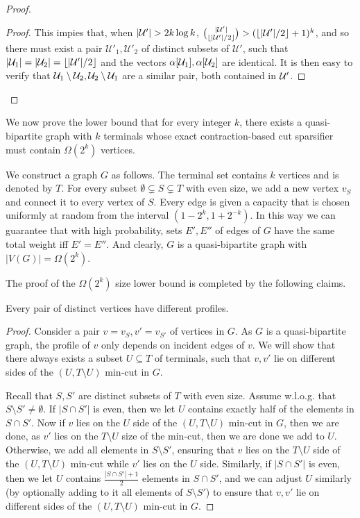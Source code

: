 \begin{proof}
\begin{proof}
This impies that, when $|\uset'|>2k\log k$, $\binom{|{\mathcal U}'|}{\left\lfloor |{\mathcal U}'|/2 \right\rfloor}>(\left\lfloor |{\mathcal U}'|/2 \right\rfloor+1)^k$, and so there must exist a pair $\mathcal{U}'_1,\mathcal{U}'_2$  of distinct subsets of $\mathcal{U}'$, such that $\left| \mathcal{U}_1 \right| = \left| \mathcal{U}_2 \right| = \left\lfloor |{\mathcal U}'|/2 \right\rfloor$ and the vectors $\alpha[{\mathcal U}_1],\alpha[{\mathcal U}_2]$ are identical.
It is then easy to verify that ${\mathcal U}_1\setminus {\mathcal U}_2,{\mathcal U}_2\setminus {\mathcal U}_1$ are a similar pair, both contained in ${\mathcal U}'$. 
\end{proof}
\end{proof}


We now prove the lower bound that for every integer $k$, there exists a quasi-bipartite graph with $k$ terminals whose exact contraction-based cut sparsifier must contain $\Omega(2^k)$ vertices.


We construct a graph $G$ as follows. The terminal set contains $k$ vertices and is denoted by $T$. For every subset $\emptyset\subsetneq S \subsetneq T$ with even size, we add a new vertex $v_S$ and connect it to every vertex of $S$.
Every edge is given a capacity that is chosen uniformly at random from the interval $(1-2^{k},1+2^{-k})$. In this way we can guarantee that with high probability, sets $E',E''$ of edges of $G$ have the same total weight iff $E'=E''$.
And clearly, $G$ is a quasi-bipartite graph with $|V(G)|=\Omega(2^k)$.

The proof of the $\Omega(2^k)$ size lower bound is completed by the following claims.

\begin{claim}
\label{clm: profiles}
Every pair of distinct vertices have different profiles.
\end{claim}
\begin{proof}
Consider a pair $v=v_S,v'=v_{S'}$ of vertices in $G$.
As $G$ is a quasi-bipartite graph, the profile of $v$ only depends on incident edges of $v$.
We will show that there always exists a subset $U\subseteq T$ of terminals, such that $v,v'$ lie on different sides of the $(U,T\setminus U)$ min-cut in $G$.

Recall that $S,S'$ are distinct subsets of $T$ with even size. Assume w.l.o.g. that $S\setminus S'\ne \emptyset$. If $|S\cap S'|$ is even, then we let $U$ contains exactly half of the elements in $S\cap S'$. Now if $v$ lies on the $U$ side of the $(U,T\setminus U)$ min-cut in $G$, then we are done, as $v'$ lies on the $T\setminus U$ size of the min-cut, then we are done we add to $U$. Otherwise, we add all elements in $S\setminus S'$, ensuring that $v$ lies on the $T\setminus U$ side of the $(U,T\setminus U)$ min-cut while $v'$ lies on the $U$ side.
Similarly, if $|S\cap S'|$ is even, then we let $U$ contains $\frac{|S\cap S'|+1}{2}$ elements in $S\cap S'$, and we can adjust $U$ similarly (by optionally adding to it all elements of $S\setminus S'$) to ensure that $v,v'$ lie on different sides of the $(U,T\setminus U)$ min-cut in $G$.
\end{proof}



